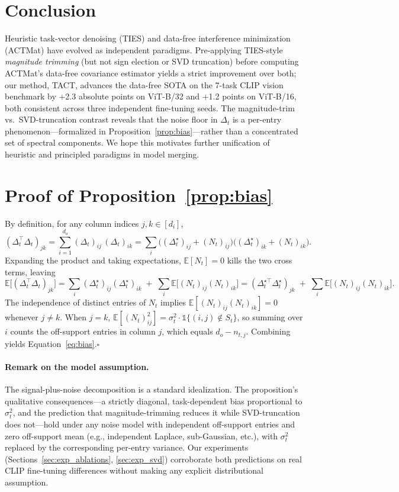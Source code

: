 \documentclass{article}
\theoremstyle{plain}
\theoremstyle{definition}
\theoremstyle{remark}
\begin{document}
\section{Conclusion}
\label{sec:conclusion}

Heuristic task-vector denoising (TIES) and data-free interference minimization (ACTMat) have evolved as independent paradigms. Pre-applying TIES-style \emph{magnitude trimming} (but not sign election or SVD truncation) before computing ACTMat's data-free covariance estimator yields a strict improvement over both; our method, TACT, advances the data-free SOTA on the 7-task CLIP vision benchmark by $+$2.3 absolute points on ViT-B/32 and $+$1.2 points on ViT-B/16, both consistent across three independent fine-tuning seeds. The magnitude-trim vs.\ SVD-truncation contrast reveals that the noise floor in $\Delta_t$ is a per-entry phenomenon---formalized in Proposition~\ref{prop:bias}---rather than a concentrated set of spectral components. We hope this motivates further unification of heuristic and principled paradigms in model merging.




\appendix
\onecolumn
\section{Proof of Proposition~\ref{prop:bias}}
\label{app:proof}
By definition, for any column indices $j, k \in [d_i]$,
\[
(\Delta_t^\top \Delta_t)_{jk} = \sum_{i=1}^{d_o} (\Delta_t)_{ij}\,(\Delta_t)_{ik}
= \sum_i \big((\Delta_t^\star)_{ij} + (N_t)_{ij}\big)\big((\Delta_t^\star)_{ik} + (N_t)_{ik}\big).
\]
Expanding the product and taking expectations, $\mathbb{E}[N_t] = 0$ kills the two cross terms, leaving
\[
\mathbb{E}\big[(\Delta_t^\top \Delta_t)_{jk}\big] = \sum_i (\Delta_t^\star)_{ij}(\Delta_t^\star)_{ik} \;+\; \sum_i \mathbb{E}\big[(N_t)_{ij}(N_t)_{ik}\big]
= (\Delta_t^{\star\top}\Delta_t^\star)_{jk} \;+\; \sum_i \mathbb{E}\big[(N_t)_{ij}(N_t)_{ik}\big].
\]
The independence of distinct entries of $N_t$ implies $\mathbb{E}[(N_t)_{ij}(N_t)_{ik}] = 0$ whenever $j \neq k$. When $j = k$,
$\mathbb{E}[(N_t)_{ij}^2] = \sigma_t^2 \cdot \mathbb{1}\{(i,j) \notin S_t\}$, so summing over $i$ counts the off-support entries in column $j$, which equals $d_o - n_{t,j}$. Combining yields Equation~\eqref{eq:bias}.\hfill$\square$

\paragraph{Remark on the model assumption.} The signal-plus-noise decomposition is a standard idealization. The proposition's qualitative consequences---a strictly diagonal, task-dependent bias proportional to $\sigma_t^2$, and the prediction that magnitude-trimming reduces it while SVD-truncation does not---hold under any noise model with independent off-support entries and zero off-support mean (e.g., independent Laplace, sub-Gaussian, etc.), with $\sigma_t^2$ replaced by the corresponding per-entry variance. Our experiments (Sections~\ref{sec:exp_ablations}, \ref{sec:exp_svd}) corroborate both predictions on real CLIP fine-tuning differences without making any explicit distributional assumption.
\end{document}
